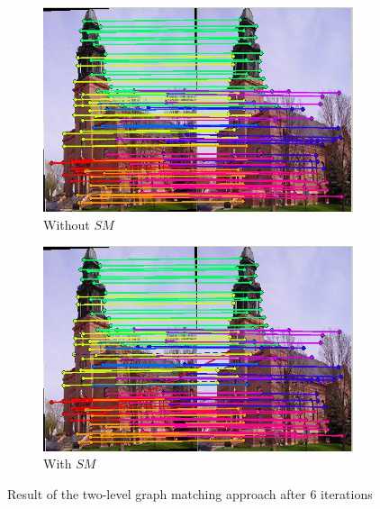\documentclass[
	fontsize=12pt,
	paper=a4,
	twoside=false,
	numbers=noenddot,
	plainheadsepline,
	toc=listof,
	toc=bibliography
]{scrartcl}
\begin{document}
\begin{figure}[ht] 
	\begin{subfigure}[b]{0.5\textwidth}
		\centering
		\includegraphics[scale=0.35]{fig/method1/test1/LL_it6.jpg} 
		\caption{Without $SM$} 
	\end{subfigure}%
	\begin{subfigure}[b]{0.5\textwidth}
		\centering
		\includegraphics[scale=0.35]{fig/method2/test1/LL_it6.jpg} 
		\caption{With $SM$} 
	\end{subfigure} 
	\caption{Result of the two-level graph matching approach after $6$ iterations }
\end{figure}
\end{document}
